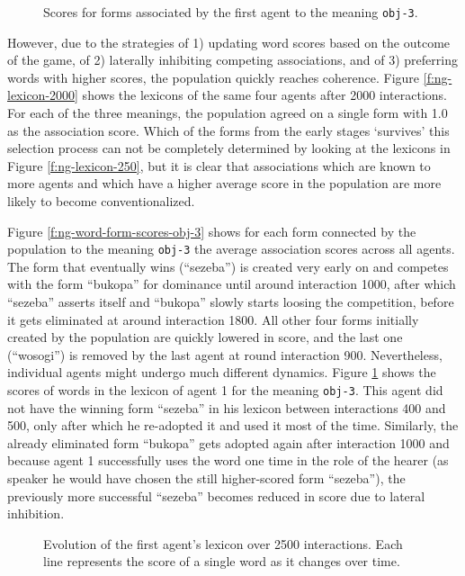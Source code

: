 \begin{figure}[t]
  \caption{Scores for forms associated by the first agent to the
    meaning \texttt{obj-3}.}
  \label{f:ng-word-form-scores-obj-3-agent-1}
\end{figure}


However, due to the strategies of 1) updating word scores based on the
outcome of the game, of 2) laterally inhibiting competing
associations, and of 3) preferring words with higher scores, the
population quickly reaches coherence. Figure \ref{f:ng-lexicon-2000}
shows the lexicons of the same four agents after 2000
interactions. For each of the three meanings, the population agreed on
a single form with 1.0 as the association score. Which of the forms
from the early stages `survives' this selection process can not be
completely determined by looking at the lexicons in Figure
\ref{f:ng-lexicon-250}, but it is clear that associations which are
known to more agents and which have a higher average score in the
population are more likely to become conventionalized.

Figure \ref{f:ng-word-form-scores-obj-3} shows for each form connected
by the population to the meaning \texttt{obj-3} the average
association scores across all agents. The form that eventually wins
(``sezeba'') is created very early on and competes with the form
``bukopa'' for dominance until around interaction 1000, after which
``sezeba'' asserts itself and ``bukopa'' slowly starts loosing the
competition, before it gets eliminated at around interaction 1800. All
other four forms initially created by the population are quickly
lowered in score, and the last one (``wosogi'') is removed by the last
agent at round interaction 900. Nevertheless, individual agents might
undergo much different dynamics. Figure
\ref{f:ng-word-form-scores-obj-3-agent-1} shows the scores of words in
the lexicon of agent 1 for the meaning \texttt{obj-3}. This agent did
not have the winning form ``sezeba'' in his lexicon between
interactions 400 and 500, only after which he re-adopted it and used
it most of the time. Similarly, the already eliminated form ``bukopa''
gets adopted again after interaction 1000 and because agent 1
successfully uses the word one time in the role of the hearer (as
speaker he would have chosen the still higher-scored form ``sezeba''),
the previously more successful ``sezeba'' becomes reduced in score due
to lateral inhibition. 


\begin{figure}[t]
  \caption{Evolution of the first agent's lexicon over 2500
    interactions. Each line represents the score of a single word as
    it changes over time.}
  \label{f:ng-word-scores}
\end{figure}

